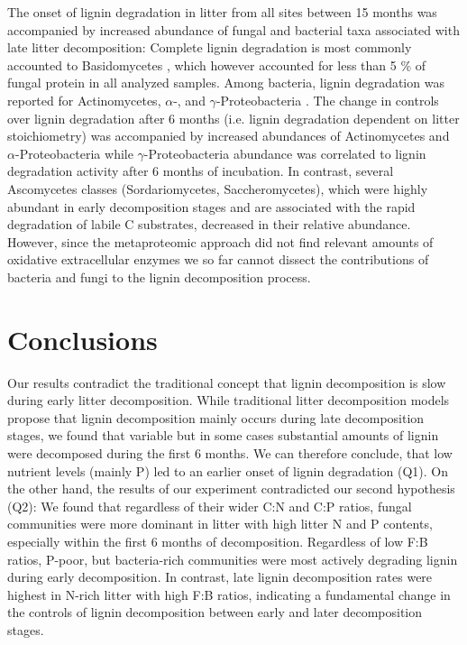 The onset of lignin degradation in litter from all sites between 15 months was accompanied by increased abundance of fungal and bacterial taxa associated with late litter decomposition: Complete lignin degradation is most commonly accounted to Basidomycetes \cite{Berg2008}, which however accounted for less than 5 \% of fungal protein in all analyzed samples. Among bacteria, lignin degradation was reported for Actinomycetes, $\alpha$-, and $\gamma$-Proteobacteria \cite{Bugg2011}. The change in controls over lignin degradation  after 6 months (i.e. lignin degradation dependent on litter stoichiometry) was accompanied by increased abundances of Actinomycetes and $\alpha$-Proteobacteria while $\gamma$-Proteobacteria abundance was correlated to lignin degradation activity after 6 months of incubation. In contrast, several Ascomycetes classes (Sordariomycetes, Saccheromycetes), which were highly abundant in early decomposition stages and are associated with the rapid degradation of labile C substrates, decreased in their relative abundance. However, since the metaproteomic approach did not find relevant amounts of oxidative extracellular enzymes we so far cannot dissect the contributions of bacteria and fungi to the lignin decomposition process. 

\section*{Conclusions}
Our results contradict the traditional concept that lignin decomposition is slow during early litter decomposition. While traditional litter decomposition models propose that lignin decomposition mainly occurs during late decomposition stages, we found that variable but in some cases substantial amounts of lignin were decomposed during the first 6 months. We can therefore conclude, that low nutrient levels (mainly P) led to an earlier onset of lignin degradation (Q1). On the other hand, the results of our experiment contradicted our second hypothesis (Q2): We found that regardless of their wider C:N and C:P ratios, fungal communities were more dominant in litter with high litter N and P contents, especially within the first 6 months of decomposition. Regardless of low F:B ratios, P-poor, but bacteria-rich communities were most actively degrading lignin during early decomposition.  In contrast, late lignin decomposition rates were highest in N-rich litter with high F:B ratios, indicating a fundamental change in the controls of lignin decomposition between early and later decomposition stages.












